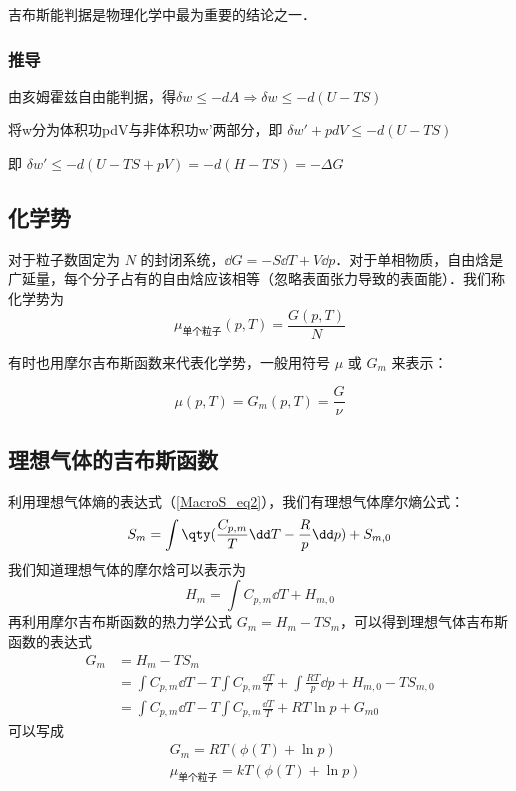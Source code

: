 吉布斯能判据是物理化学中最为重要的结论之一．

\subsubsection{推导}
由亥姆霍兹自由能判据，得$\delta w \le -dA\Rightarrow \delta w \le -d(U-TS)$

将w分为体积功pdV与非体积功w'两部分，即
$\delta w' + pdV \le -d(U-TS)$

即 $\delta w'  \le -d(U-TS+pV) = -d(H-TS) = -\Delta G$

\subsection{化学势}

对于粒子数固定为 $N$ 的封闭系统，$\dd G=-S\dd T+V\dd p$．对于单相物质，自由焓是广延量，每个分子占有的自由焓应该相等（忽略表面张力导致的表面能）．我们称化学势为
\begin{equation}
\mu_{\text{单个粒子}}(p,T)=\frac{G(p,T)}{N}
\end{equation}

有时也用摩尔吉布斯函数来代表化学势，一般用符号 $\mu$ 或 $G_m$ 来表示：

\begin{equation}\label{GibbsG_eq1}
\mu(p,T)=G_m(p,T)=\frac{G}{\nu}
\end{equation}

\subsection{理想气体的吉布斯函数}
利用理想气体熵的表达式（\autoref{MacroS_eq2}），我们有理想气体摩尔熵公式：
\begin{equation}
S_m=\int \qty(\frac{C_{p,m}}{T}\dd T-\frac{R}{p}\dd p)+S_{m,0}
\end{equation}
我们知道理想气体的摩尔焓可以表示为
\begin{equation}
H_m=\int C_{p,m}\dd T+H_{m,0}
\end{equation}
再利用摩尔吉布斯函数的热力学公式 $G_m=H_m-TS_m$，可以得到理想气体吉布斯函数的表达式
\begin{equation}
\begin{aligned}
G_m&=H_m-TS_m\\
&=\int C_{p,m} \dd T - T\int C_{p,m} \frac{\dd T}{T}+\int \frac{RT}{p}\dd p +H_{m,0}-TS_{m,0}
\\
&=\int C_{p,m} \dd T - T\int C_{p,m} \frac{\dd T}{T}+RT\ln p+G_{m0}
\end{aligned}
\end{equation}
可以写成
\begin{equation}\label{GibbsG_eq3}
\begin{aligned}
&G_m=RT(\phi(T)+\ln p)\\
&\mu_{\text{单个粒子}} = kT(\phi(T)+\ln p)
\end{aligned}
\end{equation}

